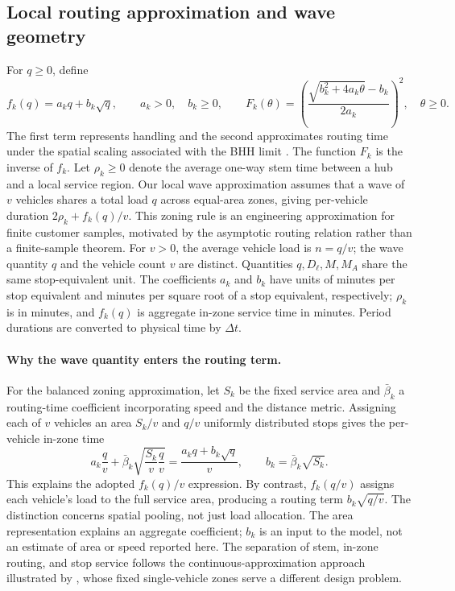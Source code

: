 \subsection{Local routing approximation and wave geometry}

For $q\geq0$, define
\begin{equation}
 f_k(q)=a_kq+b_k\sqrt q,\qquad a_k>0,\quad b_k\geq0,
 \qquad
 F_k(\theta)=\left(\frac{\sqrt{b_k^2+4a_k\theta}-b_k}{2a_k}\right)^2,
 \quad \theta\geq0.
 \label{mod:local-function}
\end{equation}
The first term represents handling and the second approximates routing time
under the spatial scaling associated with the BHH limit
\cite{Beardwood1959}. The function $F_k$ is the inverse of $f_k$.
Let $\rho_k\geq0$ denote the average one-way stem time between a hub
and a local service region. Our local wave approximation
assumes that a wave of $v$ vehicles shares a total load $q$ across equal-area
zones, giving per-vehicle duration $2\rho_k+f_k(q)/v$.
This zoning rule is an engineering approximation for finite customer
samples, motivated by the asymptotic routing relation rather than a
finite-sample theorem. For $v>0$, the average vehicle load is $n=q/v$;
the wave quantity $q$ and the vehicle count $v$ are distinct.
Quantities $q,D_\ell,M,M_A$ share the same stop-equivalent unit.
The coefficients $a_k$ and $b_k$ have units of minutes per stop equivalent
and minutes per square root of a stop equivalent, respectively;
$\rho_k$ is in minutes, and $f_k(q)$ is aggregate in-zone service time
in minutes. Period durations are converted to physical time by $\Delta t$.

\paragraph{Why the wave quantity enters the routing term.}
For the balanced zoning approximation, let $S_k$ be the fixed service
area and $\bar\beta_k$ a routing-time coefficient incorporating speed
and the distance metric. Assigning each of $v$ vehicles an area $S_k/v$
and $q/v$ uniformly distributed stops gives the per-vehicle in-zone time
\begin{equation}
 a_k\frac qv+\bar\beta_k\sqrt{\frac{S_k}{v}\frac qv}
 =\frac{a_kq+b_k\sqrt q}{v},\qquad
 b_k=\bar\beta_k\sqrt{S_k}.
 \label{eq:wave-geometry}
\end{equation}
This explains the adopted $f_k(q)/v$ expression. By contrast, $f_k(q/v)$
assigns each vehicle's load to the full service area, producing a routing
term $b_k\sqrt{q/v}$. The distinction concerns spatial pooling, not just
load allocation. The area representation explains an aggregate coefficient;
$b_k$ is an input to the model, not an estimate of area or speed reported
here. The separation of stem, in-zone routing, and stop service follows
the continuous-approximation approach illustrated by
\citet{Banerjee2022}, whose fixed single-vehicle zones serve a
different design problem.


